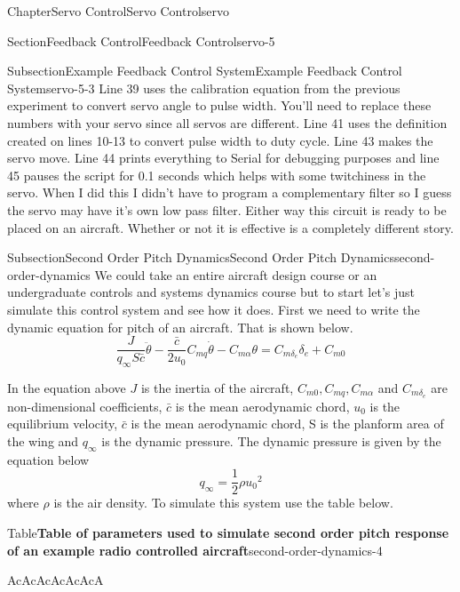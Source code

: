 \documentclass[oneside,10pt,]{book}
\newcommand{\tabularfont}{\relax}
\numberwithin{equation}{section}
\newcommand{\hrulethin}  {\noalign{\hrule height 0.04em}}
\begin{document}
\begin{chapterptx}{Chapter}{Servo Control}{}{Servo Control}{}{}{servo}
\begin{sectionptx}{Section}{Feedback Control}{}{Feedback Control}{}{}{servo-5}
\begin{subsectionptx}{Subsection}{Example Feedback Control System}{}{Example Feedback Control System}{}{}{servo-5-3}
Line 39 uses the calibration equation from the previous experiment to convert servo angle to pulse width. You'll need to replace these numbers with your servo since all servos are different. Line 41 uses the definition created on lines 10-13 to convert pulse width to duty cycle. Line 43 makes the servo move. Line 44 prints everything to Serial for debugging purposes and line 45 pauses the script for 0.1 seconds which helps with some twitchiness in the servo. When I did this I didn't have to program a complementary filter so I guess the servo may have it's own low pass filter. Either way this circuit is ready to be placed on an aircraft. Whether or not it is effective is a completely different story.%
\end{subsectionptx}
%
%
\typeout{************************************************}
\typeout{************************************************}
%
\begin{subsectionptx}{Subsection}{Second Order Pitch Dynamics}{}{Second Order Pitch Dynamics}{}{}{second-order-dynamics}
We could take an entire aircraft design course or an undergraduate controls and systems dynamics course but to start let's just simulate this control system and see how it does. First we need to write the dynamic equation for pitch of an aircraft. That is shown below.%
\begin{equation}
\frac{J}{q_{\infty}S\bar{c}}\ddot{\theta} - \frac{\bar{c}}{2u_0}C_{mq}\dot{\theta} - C_{m\alpha}\theta = C_{m\delta_e}\delta_e + C_{m0}\label{e_second-order}
\end{equation}
%
\par
In the equation above \(J\) is the inertia of the aircraft, \(C_{m0},C_{mq},C_{m\alpha}\) and \(C_{m\delta_e}\) are non-dimensional coefficients, \(\bar{c}\) is the mean aerodynamic chord, \(u_0\) is the equilibrium velocity, \(\bar{c}\) is the mean aerodynamic chord, S is the planform area of the wing and \(q_{\infty}\) is the dynamic pressure. The dynamic pressure is given by the equation below%
\begin{equation}
q_{\infty} = \frac{1}{2}\rho {u_0}^2\label{second-order-dynamics-3-8}
\end{equation}
where \(\rho\) is the air density. To simulate this system use the table below.%
\begin{tableptx}{Table}{\textbf{Table of parameters used to simulate second order pitch response of an example radio controlled aircraft}}{second-order-dynamics-4}{}%
\centering%
{\tabularfont%
\begin{tabular}{AcAcAcAcAcAcA}\hrulethin

\end{tabular}}
\end{tableptx}
\end{subsectionptx}
\end{sectionptx}
\end{chapterptx}
\end{document}
